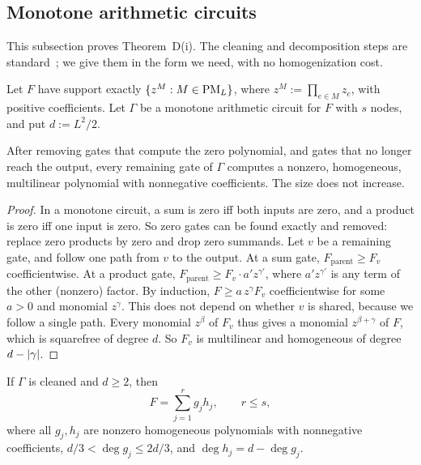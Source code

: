 \subsection{Monotone arithmetic circuits}\label{sec:monotone}

This subsection proves Theorem~D(i). The cleaning and decomposition steps are standard~\cite{Valiant80,JerrumSnir82}; we give them in the form we need, with no homogenization cost.

Let $F$ have support exactly $\{z^M:M\in\mathrm{PM}_L\}$, where $z^M:=\prod_{e\in M}z_e$, with positive coefficients. Let $\Gamma$ be a monotone arithmetic circuit for $F$ with $s$ nodes, and put $d:=L^2/2$.

\begin{lemma}[cleaning]\label{lem:cleaning}
After removing gates that compute the zero polynomial, and gates that no longer reach the output, every remaining gate of $\Gamma$ computes a nonzero, homogeneous, multilinear polynomial with nonnegative coefficients. The size does not increase.
\end{lemma}

\begin{proof}
In a monotone circuit, a sum is zero iff both inputs are zero, and a product is zero iff one input is zero. So zero gates can be found exactly and removed: replace zero products by zero and drop zero summands. Let $v$ be a remaining gate, and follow one path from $v$ to the output. At a sum gate, $F_{\mathrm{parent}}\ge F_v$ coefficientwise. At a product gate, $F_{\mathrm{parent}}\ge F_v\cdot a'z^{\gamma'}$, where $a'z^{\gamma'}$ is any term of the other (nonzero) factor. By induction, $F\ge a\,z^\gamma F_v$ coefficientwise for some $a>0$ and monomial $z^\gamma$. This does not depend on whether $v$ is shared, because we follow a single path. Every monomial $z^\beta$ of $F_v$ thus gives a monomial $z^{\beta+\gamma}$ of $F$, which is squarefree of degree $d$. So $F_v$ is multilinear and homogeneous of degree $d-\lvert \gamma\rvert$.
\end{proof}

\begin{lemma}\label{lem:degree-decomp}
If $\Gamma$ is cleaned and $d\ge2$, then
\[
  F=\sum_{j=1}^rg_jh_j,\qquad r\le s,
\]
where all $g_j,h_j$ are nonzero homogeneous polynomials with nonnegative coefficients, $d/3<\deg g_j\le2d/3$, and $\deg h_j=d-\deg g_j$.
\end{lemma}

